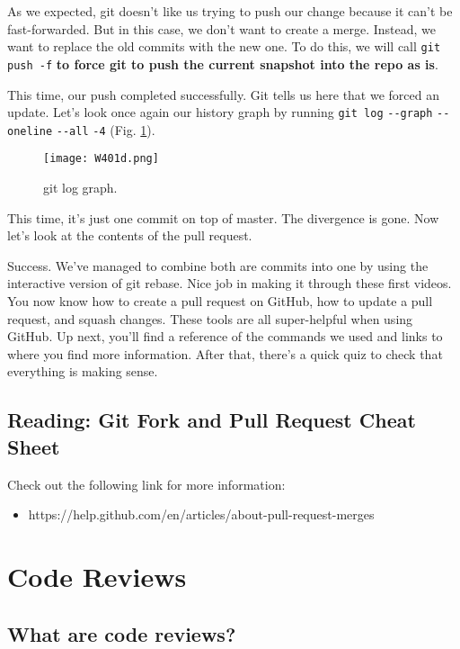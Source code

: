 	As we expected, git doesn't like us trying to push our change because it can't be fast-forwarded. But in this case, we don't want to create a merge. Instead, we want to replace the old commits with the new one. To do this, we will call \verb|git push -f| \textbf{to force git to push the current snapshot into the repo as is}.
	
	This time, our push completed successfully. Git tells us here that we forced an update. Let's look once again our history graph by running \texttt{git log} \verb|--graph| \verb|--oneline| \verb|--all| \verb|-4| (Fig. \ref{W401d}). 
	
	\begin{figure} 
		\caption{git log graph.}
		\centering
		\texttt{[image: W401d.png]}
		\label{W401d}
	\end{figure}
	
	This time, it's just one commit on top of master. The divergence is gone. Now let's look at the contents of the pull request.
	
	Success. We've managed to combine both are commits into one by using the interactive version of git rebase. Nice job in making it through these first videos. You now know how to create a pull request on GitHub, how to update a pull request, and squash changes. These tools are all super-helpful when using GitHub. Up next, you'll find a reference of the commands we used and links to where you find more information. After that, there's a quick quiz to check that everything is making sense.
	
	\subsection{Reading: Git Fork and Pull Request Cheat Sheet}

	Check out the following link for more information:
	\begin{itemize}
		\item https://help.github.com/en/articles/about-pull-request-merges
	\end{itemize}
	

\section{Code Reviews}

	\subsection{What are code reviews?}
	
